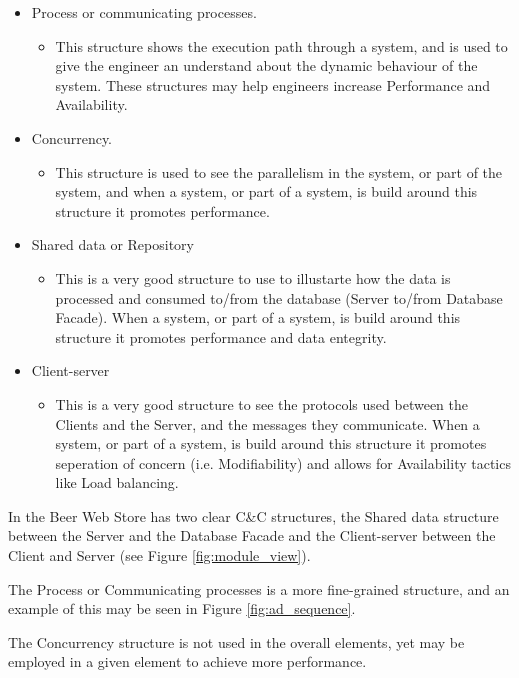 \begin{itemize}
  \item Process or communicating processes.
	\begin{itemize}
	  \item This structure shows the execution path through a system, and is used to give the engineer an understand about the dynamic behaviour of the system. These structures may help engineers increase Performance and Availability.
	\end{itemize}
  \item Concurrency.
	\begin{itemize}
	  \item This structure is used to see the parallelism in the system, or part of the system, and when a system, or part of a system, is build around this structure it promotes performance. 
	\end{itemize}
  \item Shared data or Repository
	\begin{itemize}
	  \item This is a very good structure to use to illustarte how the data is processed and consumed to/from the database (Server to/from Database Facade). When a system, or part of a system, is build around this structure it promotes performance and data entegrity. 
	\end{itemize}
  \item Client-server
	\begin{itemize}
  		\item This is a very good structure to see the protocols used between the Clients and the Server, and the messages they communicate. When a system, or part of a system, is build around this structure it promotes seperation of concern (i.e. Modifiability) and allows for Availability tactics like Load balancing.
	\end{itemize}
\end{itemize}

In the Beer Web Store has two clear C\&C structures, the Shared data structure between the Server and the Database Facade and the Client-server between the Client and Server (see Figure \ref{fig:module_view}).

The Process or Communicating processes is a more fine-grained structure, and an example of this may be seen in Figure \ref{fig:ad_sequence}.

The Concurrency structure is not used in the overall elements, yet may be employed in a given element to achieve more performance.

